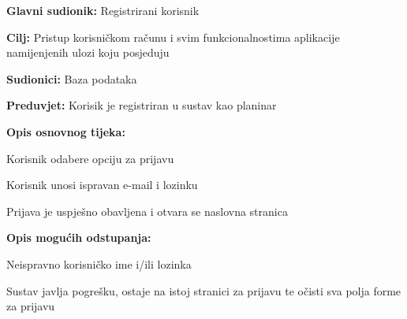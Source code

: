 			\noindent {}
		\begin{packed_item}
			
			\item \textbf{Glavni sudionik: }$ $Registrirani korisnik $ $
			\item  \textbf{Cilj:} $ $Pristup korisničkom računu i svim funkcionalnostima aplikacije namijenjenih ulozi koju posjeduju$ $
			\item  \textbf{Sudionici:} $ $Baza podataka$ $
			\item  \textbf{Preduvjet:} $ $Korisik je registriran u sustav kao planinar$ $
			\item  \textbf{Opis osnovnog tijeka:}
			
			\item[] \begin{packed_enum}
				
				\item $ $Korisnik odabere opciju za prijavu$ $
				\item $ $Korisnik unosi ispravan e-mail i lozinku$ $
				\item $ $Prijava je uspješno obavljena i otvara se naslovna stranica$ $
				
			\end{packed_enum}
			
			\item  \textbf{Opis mogućih odstupanja:}
			
			\item[] \begin{packed_item}
				
				\item[3.a] $ $Neispravno korisničko ime i/ili lozinka $ $
				\item[] \begin{packed_enum}
					
					\item $ $Sustav javlja pogrešku, ostaje na istoj stranici za prijavu te očisti sva polja forme za prijavu$ $
				\end{packed_enum}
			\end{packed_item}
		\end{packed_item}
	
